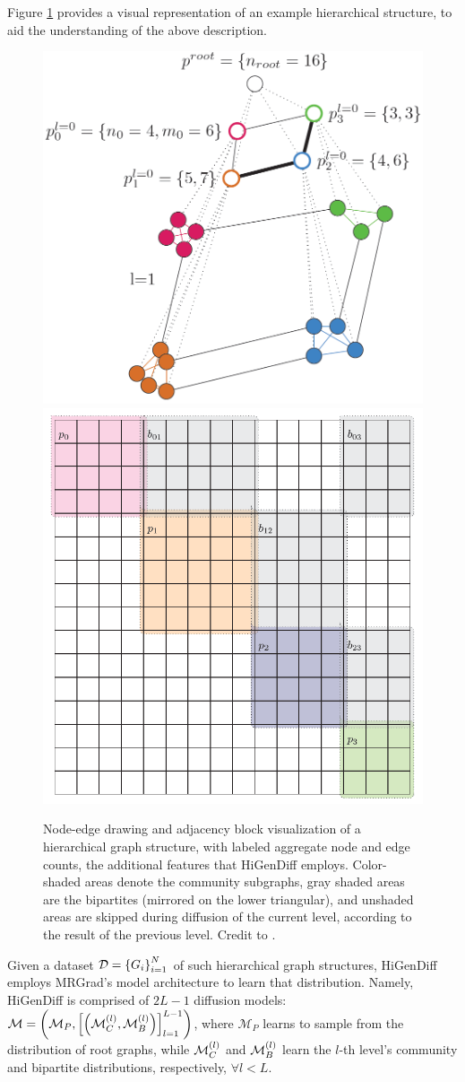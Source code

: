Figure \ref{fig:higendiff} provides a visual representation of an example hierarchical structure, to aid the understanding of the above description.
\begin{figure}[H]
    \centering
    \includegraphics[width=0.35\linewidth]{figures/higendiff/hierarchical_graph.png}
    \includegraphics[width=0.35\linewidth]{figures/higendiff/hierarchical_adj.png}
    \caption[Node-edge drawing and adjacency block visualization of a hierarchical graph structure.]{Node-edge drawing and adjacency block visualization of a hierarchical graph structure, with labeled aggregate node and edge counts, the additional features that HiGenDiff employs. Color-shaded areas denote the community subgraphs, gray shaded areas are the bipartites (mirrored on the lower triangular), and unshaded areas are skipped during diffusion of the current level, according to the result of the previous level. Credit to \cite{karami_multi-resolution_2024}.}
    \label{fig:higendiff}
\end{figure}
Given a dataset $\mathcal{D}=\mathopen{}\left\{G_i\right\}_{i=1}^{N}$ of such hierarchical graph structures, HiGenDiff employs MRGrad's model architecture \cite{karami_multi-resolution_2024} to learn that distribution. Namely, HiGenDiff is comprised of $2L-1$ diffusion models: $\mathcal{M}=\mathopen{}\left(\mathcal{M}_P,\mathopen{}\left[\mathopen{}\left(\mathcal{M}^{\mathopen{}\left(l\right)}_C,\mathcal{M}^{\mathopen{}\left(l\right)}_B\right)\right]_{l=1}^{L-1}\right)$, where $\mathcal{M}_P$ learns to sample from the distribution of root graphs, while $\mathcal{M}^{\mathopen{}\left(l\right)}_C$ and $\mathcal{M}^{\mathopen{}\left(l\right)}_B$ learn the $l$-th level's community and bipartite distributions, respectively, $\forall l<L$. 

